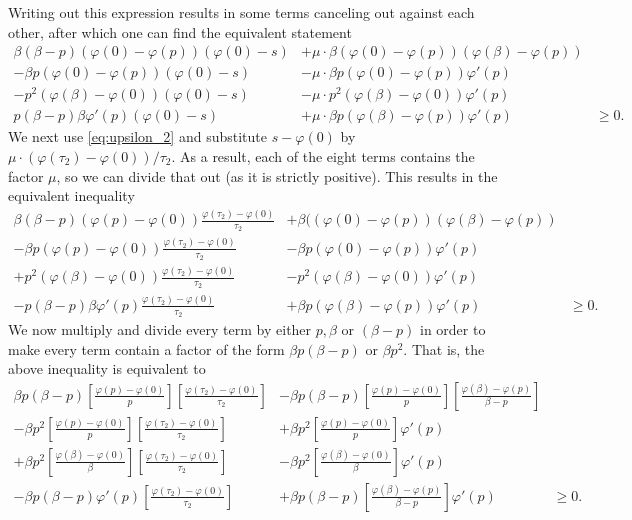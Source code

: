 \documentclass[11pt]{article}
\newcommand{\1}{\mathds{1}}
\begin{document}
\noindent Writing out this expression results in some terms canceling out against each other, after which one can find the equivalent statement
\begin{align}
\beta(\beta-p)(\varphi(0) - \varphi(p))(\varphi(0) - s) &+ \mu \cdot \beta(\varphi(0) - \varphi(p))(\varphi(\beta) - \varphi(p)) &\nonumber \\
-\beta p(\varphi(0) - \varphi(p))(\varphi(0) - s) &- \mu \cdot \beta p(\varphi(0) - \varphi(p))\varphi'(p) &\nonumber \\
-p^2(\varphi(\beta) - \varphi(0))(\varphi(0) - s) & - \mu \cdot p^2(\varphi(\beta) - \varphi(0))\varphi'(p) &\nonumber \\
p(\beta-p)\beta\varphi'(p)(\varphi(0) - s) & + \mu \cdot \beta p(\varphi(\beta) - \varphi(p))\varphi'(p) & \geq 0.
\end{align}
We next use \eqref{eq:upsilon_2} and substitute $s - \varphi(0)$ by $\mu \cdot (\varphi(\tau_2) - \varphi(0))/\tau_2$. As a result, each of the eight terms contains the factor $\mu$, so we can divide that out (as it is strictly positive). This results in the equivalent inequality
\begin{align}
\beta(\beta-p)(\varphi(p) - \varphi(0))\frac{\varphi(\tau_2)-\varphi(0)}{\tau_2} &+ \beta((\varphi(0) - \varphi(p))(\varphi(\beta) - \varphi(p)) & \nonumber \\
-\beta p(\varphi(p) - \varphi(0))\frac{\varphi(\tau_2)-\varphi(0)}{\tau_2} &- \beta p(\varphi(0) - \varphi(p))\varphi'(p) & \nonumber \\
+p^2(\varphi(\beta) - \varphi(0))\frac{\varphi(\tau_2)-\varphi(0)}{\tau_2} & -   p^2(\varphi(\beta) - \varphi(0))\varphi'(p) & \nonumber \\
-p(\beta-p)\beta\varphi'(p)\frac{\varphi(\tau_2)-\varphi(0)}{\tau_2} & +  \beta p(\varphi(\beta) - \varphi(p))\varphi'(p) & \geq 0.
\end{align}
We now multiply and divide every term by either $p,\beta$ or $(\beta-p)$ in order to make every term contain a factor of the form $\beta p(\beta-p)$ or $\beta p^2$. That is, the above inequality is equivalent to
\begin{align}
\beta p(\beta-p)\left[\frac{\varphi(p) - \varphi(0)}{p}\right]\left[\frac{\varphi(\tau_2)-\varphi(0)}{\tau_2}\right] &-  \beta p(\beta-p)\left[\frac{\varphi(p) - \varphi(0)}{p}\right]\left[\frac{\varphi(\beta) - \varphi(p)}{\beta-p}\right] & \nonumber \\[1.5ex]
-\beta p^2\left[\frac{\varphi(p) - \varphi(0)}{p}\right]\left[\frac{\varphi(\tau_2)-\varphi(0)}{\tau_2}\right] &+ \beta p^2\left[\frac{\varphi(p) - \varphi(0)}{p}\right]\varphi'(p) & \nonumber \\[1.5ex]
+\beta p^2\left[\frac{\varphi(\beta) - \varphi(0)}{\beta}\right]\left[\frac{\varphi(\tau_2)-\varphi(0)}{\tau_2}\right] & -   \beta p^2\left[\frac{\varphi(\beta) - \varphi(0)}{\beta}\right]\varphi'(p) & \nonumber\\[1.5ex]
-\beta p(\beta-p)\varphi'(p)\left[\frac{\varphi(\tau_2)-\varphi(0)}{\tau_2}\right] & +  \beta p(\beta-p)\left[\frac{\varphi(\beta) - \varphi(p)}{\beta-p}\right]\varphi'(p) & \geq 0.
\end{align}
\end{document}
